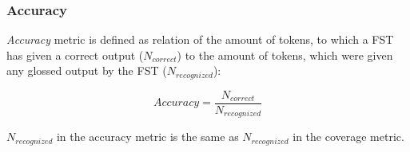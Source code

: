 \subsubsection*{Accuracy}
\textit{Accuracy} metric is defined as relation of the amount of tokens, to which a FST has given a correct output ($N_{correct}$) to the amount of tokens, which were given any glossed output by the FST ($N_{recognized}$):

\[Accuracy = \frac{N_{correct}}{N_{recognized}}\]

$N_{recognized}$ in the accuracy metric is the same as $N_{recognized}$ in the coverage metric. 

